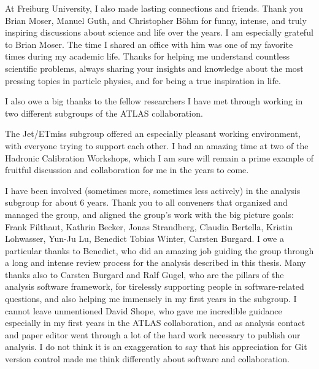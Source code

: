 At Freiburg University, I also made lasting connections and friends. Thank you Brian Moser, Manuel Guth, and Christopher Böhm for funny, intense, and truly inspiring discussions about science and life over the years.
I am especially grateful to Brian Moser. The time I shared an office with him was one of my favorite times during my academic life. Thanks for helping me understand countless scientific problems, always sharing your insights and knowledge about the most pressing topics in particle physics, and for being a true inspiration in life.

I also owe a big thanks to the fellow researchers I have met through working in two different subgroups of the ATLAS collaboration. 

The Jet/ETmiss subgroup offered an especially pleasant working environment, with everyone trying to support each other. I had an amazing time at two of the Hadronic Calibration Workshops, which I am sure will remain a prime example of fruitful discussion and collaboration for me in the years to come. 

I have been involved (sometimes more, sometimes less actively) in the \HWW analysis subgroup for about 6 years.
Thank you to all conveners that organized and managed the group, and aligned the group's work with the big picture goals: Frank Filthaut, Kathrin Becker, Jonas Strandberg, Claudia Bertella, Kristin Lohwasser, Yun-Ju Lu, Benedict Tobias Winter, Carsten Burgard. 
I owe a particular thanks to Benedict, who did an amazing job guiding the group through a long and intense review process for the analysis described in this thesis. 
Many thanks also to Carsten Burgard and Ralf Gugel, who are the pillars of the analysis software framework, for tirelessly supporting people in software-related questions, and also helping me immensely in my first years in the \HWW subgroup. 
I cannot leave unmentioned David Shope, who gave me incredible guidance especially in my first years in the ATLAS collaboration, and as analysis contact and paper editor went through a lot of the hard work necessary to publish our analysis. I do not think it is an exaggeration to say that his appreciation for Git version control made me think differently about software and collaboration. 

